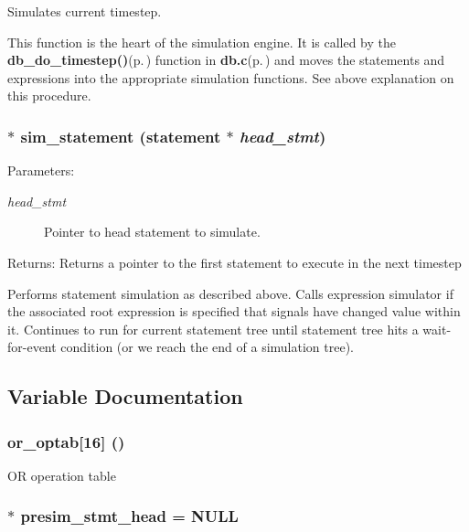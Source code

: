 Simulates current timestep. 

This function is the heart of the simulation engine. It is called by the {\bf db\_\-do\_\-timestep()}{\rm (p.\,\pageref{db_8c_a48})} function in {\bf db.c}{\rm (p.\,\pageref{db_8c})} and moves the statements and expressions into the appropriate simulation functions. See above explanation on this procedure. 
\subsubsection{$\ast$ sim\_\-statement ({\bf statement} $\ast$ {\em head\_\-stmt})}\label{sim_8c_a10}


\begin{Desc}
\item[Parameters:]
\begin{description}
\item[{\em head\_\-stmt}]Pointer to head statement to simulate.\end{description}
\end{Desc}
\begin{Desc}
\item[Returns:]Returns a pointer to the first statement to execute in the next timestep\end{Desc}
Performs statement simulation as described above. Calls expression simulator if the associated root expression is specified that signals have changed value within it. Continues to run for current statement tree until statement tree hits a wait-for-event condition (or we reach the end of a simulation tree). 

\subsection{Variable Documentation}
\subsubsection{ {\bf or\_\-optab}[16] ()}\label{sim_8c_a0}


OR operation table 
\subsubsection{$\ast$ {\bf presim\_\-stmt\_\-head} = NULL}\label{sim_8c_a3}


